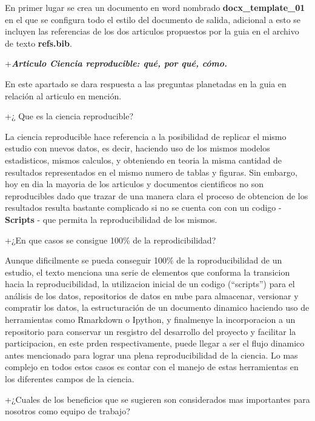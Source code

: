 \documentclass[
]{article}
\begin{document}
En primer lugar se crea un documento en word nombrado
\textbf{docx\_template\_01} en el que se configura todo el estilo del
documento de salida, adicional a esto se incluyen las referencias de los
dos articulos propuestos por la guia en el archivo de texto
\textbf{refs.bib}.

+\textbf{\emph{Articulo Ciencia reproducible: qué, por qué, cómo. }}

En este apartado se dara respuesta a las preguntas planetadas en la guia
en relación al articulo en mención.

+¿ Que es la ciencia reproducible?

La ciencia reproducible hace referencia a la posibilidad de replicar el
mismo estudio con nuevos datos, es decir, haciendo uso de los mismos
modelos estadisticos, mismos calculos, y obteniendo en teoria la misma
cantidad de resultados representados en el mismo numero de tablas y
figuras. Sin embargo, hoy en dia la mayoria de los articulos y
documentos cientificos no son reproducibles dado que trazar de una
manera clara el proceso de obtencion de los resultados resulta bastante
complicado si no se cuenta con con un codigo - \textbf{Scripts} - que
permita la reproducibilidad de los mismos.

+¿En que casos se consigue 100\% de la reprodicibilidad?

Aunque dificilmente se pueda conseguir 100\% de la roproducibilidad de
un estudio, el texto menciona una serie de elementos que conforma la
transicion hacia la reproducibilidad, la utilizacion inicial de un
codigo (``scripts'') para el análisis de los datos, repositorios de
datos en nube para almacenar, versionar y compratir los datos, la
estructuración de un documento dinamico haciendo uso de herramientas
como Rmarkdown o Ipython, y finalmenye la incorporacion a un repositorio
para conservar un resgistro del desarrollo del proyecto y facilitar la
participacion, en este prden respectivamente, puede llegar a ser el
flujo dinamico antes mencionado para lograr una plena reproducibilidad
de la ciencia. Lo mas complejo en todos estos casos es contar con el
manejo de estas herramientas en los diferentes campos de la ciencia.

+¿Cuales de los beneficios que se sugieren son considerados mas
importantes para nosotros como equipo de trabajo?
\end{document}
